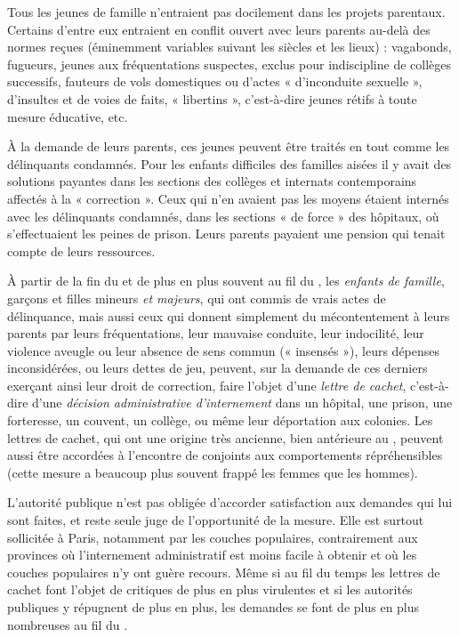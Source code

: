  Tous les jeunes de famille n'entraient pas docilement dans les projets parentaux. Certains d'entre eux entraient en conflit ouvert avec leurs parents au-delà des normes reçues (éminemment variables suivant les siècles et les lieux) : vagabonds, fugueurs, jeunes aux fréquentations suspectes, exclus pour indiscipline de collèges successifs, fauteurs de vols domestiques ou d'actes « d'inconduite sexuelle », d'insultes et de voies de faits, « libertins », c'est-à-dire jeunes rétifs à toute mesure éducative, etc. 

 À la demande de leurs parents, ces jeunes peuvent être traités en tout comme les délinquants condamnés. Pour les enfants difficiles des familles aisées il y avait des solutions payantes dans les sections des collèges et internats contemporains affectés à la « correction ». Ceux qui n'en avaient pas les moyens étaient internés avec les délinquants condamnés, dans les sections « de force » des hôpitaux, où s'effectuaient les peines de prison. Leurs parents payaient une pension qui tenait compte de leurs ressources. 

 À partir de la fin du  et de plus en plus souvent au fil du , les \emph{enfants de famille}, garçons et filles mineurs \emph{et majeurs}, qui ont commis de vrais actes de délinquance, mais aussi ceux qui donnent simplement du mécontentement à leurs parents par leurs fréquentations, leur mauvaise conduite, leur indocilité, leur violence aveugle ou leur absence de sens commun (« insensés »), leurs dépenses inconsidérées, ou leurs dettes de jeu, peuvent, sur la demande de ces derniers exerçant ainsi leur droit de correction, faire l'objet d'une \emph{lettre de cachet}, c'est-à-dire d'une \emph{décision administrative d'internement} dans un hôpital, une prison, une forteresse, un couvent, un collège, ou même leur déportation aux colonies. Les lettres de cachet, qui ont une origine très ancienne, bien antérieure au , peuvent aussi être accordées à l'encontre de conjoints aux comportements répréhensibles (cette mesure a beaucoup plus souvent frappé les femmes que les hommes). 

 L'autorité publique n'est pas obligée d'accorder satisfaction aux demandes qui lui sont faites, et reste seule juge de l'opportunité de la mesure. Elle est surtout sollicitée à Paris, notamment par les couches populaires, contrairement aux provinces où l'internement administratif est moins facile à obtenir et où les couches populaires n'y ont guère recours. Même si au fil du temps les lettres de cachet font l'objet de critiques de plus en plus virulentes et si les autorités publiques y répugnent de plus en plus, les demandes se font de plus en plus nombreuses au fil du . 

